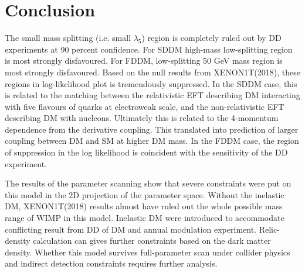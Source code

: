 \documentclass[12pt]{article}
\begin{document}
\section{Conclusion}


The small mass splitting (i.e. small $\lambda_5$) region is completely ruled out by DD experiments at 90 percent confidence. For SDDM high-mass low-splitting region is most strongly disfavoured. For FDDM, low-splitting 50 GeV mass region is most strongly disfavoured. Based on the null results from XENON1T(2018), these regions in log-likelihood plot is tremendously suppressed. In the SDDM case, this is related to the matching between the relativistic EFT describing DM interacting with five flavours of quarks at electroweak scale, and the non-relativistic EFT describing DM with nucleons. Ultimately this is related to the 4-momentum dependence from the derivative coupling. This translated into prediction of larger coupling between DM and SM at higher DM mass. In the FDDM case, the region of suppression in the log likelihood is coincident with the sensitivity of the DD experiment. 




The results of the parameter scanning show that severe constraints were put on this model in the 2D projection of the  parameter space. Without the inelastic DM,  XENON1T(2018) results almost have ruled out the whole possible mass range of WIMP in this model. Inelastic DM were introduced to accommodate conflicting result from DD of DM and annual modulation experiment. Relic-density calculation can gives further constraints based on the dark matter density. Whether this model survives full-parameter scan under collider physics and indirect detection constraints requires further analysis. 
\end{document}

